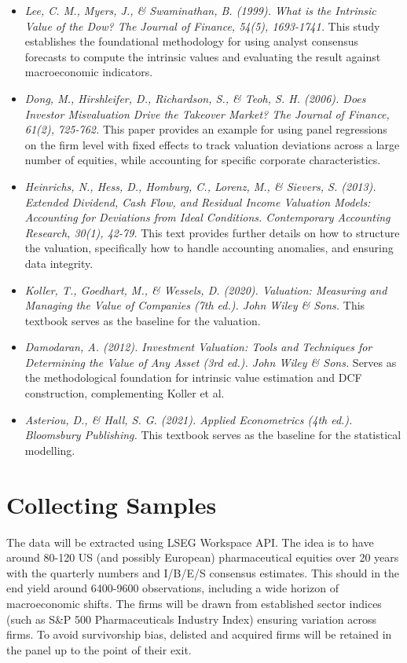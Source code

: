 \documentclass[11pt, a4paper]{article}
\begin{document}
\begin{itemize}
    \item \textit{Lee, C. M., Myers, J., \& Swaminathan, B. (1999). What is the Intrinsic Value of the Dow? The Journal of Finance, 54(5), 1693-1741.} This study establishes the foundational methodology for using analyst consensus forecasts to compute the intrinsic values and evaluating the result against macroeconomic indicators.
    \item \textit{Dong, M., Hirshleifer, D., Richardson, S., \& Teoh, S. H. (2006). Does Investor Misvaluation Drive the Takeover Market? The Journal of Finance, 61(2), 725-762.} This paper provides an example for using panel regressions on the firm level with fixed effects to track valuation deviations across a large number of equities, while accounting for specific corporate characteristics.
    \item \textit{Heinrichs, N., Hess, D., Homburg, C., Lorenz, M., \& Sievers, S. (2013). Extended Dividend, Cash Flow, and Residual Income Valuation Models: Accounting for Deviations from Ideal Conditions. Contemporary Accounting Research, 30(1), 42-79.} This text provides further details on how to structure the valuation, specifically how to handle accounting anomalies, and ensuring data integrity.
    \item \textit{Koller, T., Goedhart, M., \& Wessels, D. (2020). Valuation: Measuring and Managing the Value of Companies (7th ed.). John Wiley \& Sons.} This textbook serves as the baseline for the valuation.
    \item \textit{Damodaran, A. (2012). Investment Valuation: Tools and Techniques for Determining the Value of Any Asset (3rd ed.). John Wiley \& Sons.} Serves as the methodological foundation for intrinsic value estimation and DCF construction, complementing Koller et al.
    \item \textit{Asteriou, D., \& Hall, S. G. (2021). Applied Econometrics (4th ed.). Bloomsbury Publishing.} This textbook serves as the baseline for the statistical modelling.
\end{itemize}

\section{Collecting Samples}

The data will be extracted using LSEG Workspace API. The idea is to have around 80-120 US (and possibly European) pharmaceutical equities over 20 years with the quarterly numbers and I/B/E/S consensus estimates. This should in the end yield around 6400-9600 observations, including a wide horizon of macroeconomic shifts. The firms will be drawn from established sector indices (such as S\&P 500 Pharmaceuticals Industry Index) ensuring variation across firms. To avoid survivorship bias, delisted and acquired firms will be retained in the panel up to the point of their exit.
\end{document}
